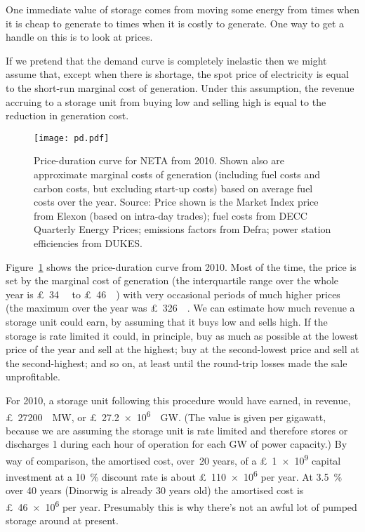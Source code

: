 \documentclass[12pt, a4paper]{article}
\begin{document}
One immediate value of storage comes from moving some energy from
times when it is cheap to generate to times when it is costly to
generate. One way to get a handle on this is to look at prices.
 
If we pretend that the demand curve is completely inelastic then we
might assume that, except when there is shortage, the spot price of
electricity is equal to the short-run marginal cost of
generation. Under this assumption, the revenue accruing to a storage
unit from buying low and selling high is equal to the reduction in
generation cost.
 
\begin{figure}[htb]
\centering
\texttt{[image: pd.pdf]}
\caption{Price-duration curve for NETA from 2010. Shown also are
  approximate marginal costs of generation (including fuel costs and
  carbon costs, but excluding start-up costs) based on average fuel
  costs over the year. Source: Price shown is the Market Index price
  from Elexon (based on intra-day trades); fuel costs from DECC
  Quarterly Energy Prices; emissions factors from Defra; power station
  efficiencies from DUKES.}
\label{fig:pd}
\end{figure}

Figure~\ref{fig:pd} shows the price-duration curve from 2010. Most of
the time, the price is set by the marginal cost of generation (the
interquartile range over the whole year is \SI{34}[\pounds]{\per\MWh}
to \SI{46}[\pounds]{\per\MWh}) with very occasional periods of much
higher prices (the maximum over the year was
\SI{326}[\pounds]{\per\MWh}. We can estimate how much revenue a
storage unit could earn, by assuming that it buys low and sells
high. If the storage is rate limited it could, in principle, buy as
much as possible at the lowest price of the year and sell at the
highest; buy at the second-lowest price and sell at the
second-highest; and so on, at least until the round-trip losses made
the sale unprofitable.

For 2010, a storage unit following this procedure would have earned,
in revenue, \SI{27200}[\pounds]{\per\MW}, or
\SI{27.2e6}[\pounds]{\per\GW}. (The value is given per gigawatt,
because we are assuming the storage unit is rate limited and therefore
stores or discharges \SI{1}{\GWh} during each hour of operation for
each \si{\GW} of power capacity.) By way of comparison, the amortised
cost, over~20 years, of a \SI{1e9}[\pounds]{} capital investment at a
\SI{10}{\percent} discount rate is about \SI{110e6}[\pounds]{} per
year. At \SI{3.5}{\percent} over 40 years (Dinorwig is already 30
years old) the amortised cost is \SI{46e6}[\pounds]{} per
year. Presumably this is why there's not an awful lot of pumped
storage around at present.
\end{document}
